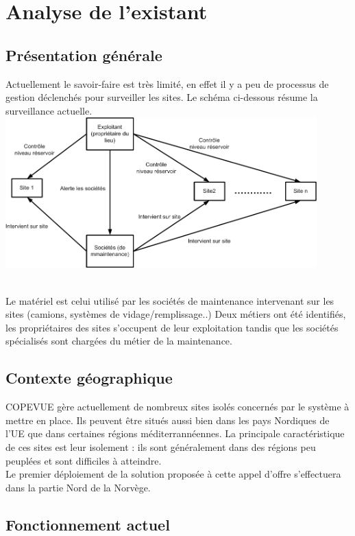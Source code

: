 \section{Analyse de l'existant}

\subsection {Présentation générale}
Actuellement le savoir-faire est très limité, en effet il y a peu de processus de gestion déclenchés pour surveiller les sites. Le schéma ci-dessous résume la surveillance actuelle.\\

\includegraphics[width=0.9\textwidth]{img/schemaAnalyseExistant.png}

~\\
Le matériel est celui utilisé par les sociétés de maintenance intervenant sur les sites (camions, systèmes de vidage/remplissage..)
Deux métiers ont été identifiés, les propriétaires des sites s’occupent de leur exploitation tandis que les sociétés spécialisés sont chargées du métier de la maintenance.

\subsection {Contexte géographique}

COPEVUE gère actuellement de nombreux sites isolés concernés par le système à mettre en place. Ils peuvent être situés aussi bien dans les pays Nordiques de l'UE que dans certaines régions méditerrannéennes. La principale caractéristique de ces sites est leur isolement : ils sont généralement dans des régions peu peuplées et sont difficiles à atteindre. \\
Le premier déploiement de la solution proposée à cette appel d'offre s'effectuera dans la partie Nord de la Norvège.


\subsection {Fonctionnement actuel}

